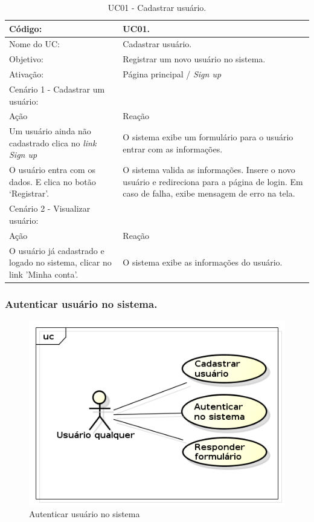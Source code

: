 \documentclass[11pt]{article}
\begin{document}
        \begin{table}[h]
          \begin{center}
            \begin{tabular}{ | p{7cm} | p{8cm} | }
              \hline
              Código: \cellcolor{gray} & UC01. \\
              \hline
              Nome do UC: \cellcolor{gray} & Cadastrar usuário. \\
              \hline
              Objetivo: \cellcolor{gray} & Registrar um novo usuário no sistema. \\
              \hline
              Ativação: \cellcolor{gray} & Página principal / \em Sign up \\
              \hline
              \hline
              Cenário 1 - Cadastrar um usuário: &  \\
              \hline
              Ação\cellcolor{gray} & Reação\cellcolor{gray} \\
              \hline
              Um usuário ainda não cadastrado clica no \em link Sign up & O sistema exibe um formulário para o usuário entrar com as informações. \\
              \hline
              O usuário entra com os dados. E clica no botão ‘Registrar’. & O sistema valida as informações. Insere o novo usuário e redireciona para a página de login. Em caso de falha, exibe mensagem de erro na tela. \\
              \hline
              \hline
              Cenário 2 - Visualizar usuário: &  \\
              \hline
              Ação\cellcolor{gray} & Reação\cellcolor{gray} \\
              \hline
              O usuário já cadastrado e logado no sistema, clicar no link 'Minha conta'. & O sistema exibe as informações do usuário. \\
              \hline
            \end{tabular}
            \caption{UC01 - Cadastrar usuário.}
          \end{center}
        \end{table}

    \clearpage

      \subsubsection{Autenticar usuário no sistema.}

        \begin{figure}[h!]
          \centering
          \includegraphics[width=.5\textwidth]{auth_create_user.png}
          \caption{Autenticar usuário no sistema}
        \end{figure}
\end{document}
